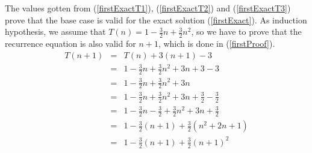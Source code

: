 \documentclass[12pt]{scrartcl}
\begin{document}
\begin{enumerate}
\begin{enumerate}
			The values gotten from (\ref{firstExactT1}), (\ref{firstExactT2}) and (\ref{firstExactT3}) prove that the base case is valid for the exact solution (\ref{firstExact}). As induction hypothesis, we assume that $T(n) = 1 - \frac{3}{2} n + \frac{3}{2}n^2$, so we have to prove that the recurrence equation is also valid for $n +1$, which is done in (\ref{firstProof}).
			\begin{eqnarray}
				T(n + 1)		&	=	&	T(n) + 3(n + 1) - 3 \nonumber\\
							&	=	&	1 - \frac{3}{2} n + \frac{3}{2}n^2 + 3n + 3 - 3 \nonumber\\
							&	=	&	1 - \frac{3}{2} n + \frac{3}{2}n^2 + 3n \nonumber\\
							&	=	&	1 - \frac{3}{2} n + \frac{3}{2}n^2 + 3n + \frac{3}{2} - \frac{3}{2}\nonumber\\
							&	=	&	1 - \frac{3}{2} n  - \frac{3}{2}+ \frac{3}{2}n^2 + 3n + \frac{3}{2} \nonumber\\
							&	=	&	1 - \frac{3}{2} \left(n + 1\right) + \frac{3}{2}\left(n^2 + 2n + 1 \right) \nonumber\\
							&	=	&	1 - \frac{3}{2} \left(n + 1\right) + \frac{3}{2}\left(n + 1 \right)^2 \label{firstProof}
			\end{eqnarray}
			

\end{enumerate}
\end{enumerate}
\end{document}
